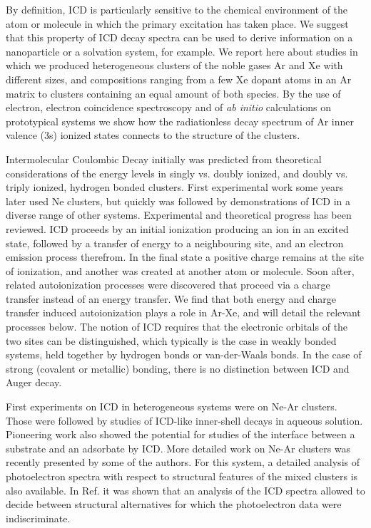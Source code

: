 \documentclass[journal=jpccck,manuscript=article,layout=twocolumn]{achemso}
\begin{document}
By definition, ICD is particularly sensitive to the chemical environment of the atom or molecule in which the primary excitation has taken place. We suggest that this property of ICD decay spectra can be used to derive information on a nanoparticle or a solvation system, for example. We report here about studies in which we produced heterogeneous clusters of the noble gases Ar and Xe with different sizes, and compositions ranging from a few Xe dopant atoms in an Ar matrix to clusters containing an equal amount of both species. By the use of electron, electron coincidence spectroscopy and of {\it ab initio} calculations on prototypical systems we show how the radiationless decay spectrum of Ar inner valence (3s) ionized states connects to the structure of the clusters.

Intermolecular Coulombic Decay initially was predicted from theoretical considerations of the energy levels in singly vs. doubly ionized, and doubly vs. triply ionized, hydrogen bonded clusters.\cite{cederbaum} First experimental work some years later used Ne clusters,\cite{marburger,jahnkenedimer} but quickly was followed by demonstrations of ICD in a diverse range of other systems. Experimental and theoretical progress has been reviewed.\cite{hergenhahn_review, averbukh_review, jahnke_review} ICD proceeds by an initial ionization producing an ion in an excited state, followed by a transfer of energy to a neighbouring site, and an electron emission process therefrom. In the final state a positive charge remains at the site of ionization, and another was created at another atom or molecule. Soon after, related autoionization processes were discovered that proceed via a charge transfer instead of an energy transfer. 
We find that both energy and charge transfer induced autoionization plays a role in Ar-Xe, and will detail the relevant processes below. The notion of ICD requires that the electronic orbitals of the two sites can be distinguished, which typically is the case in weakly bonded systems, held together by hydrogen bonds or van-der-Waals bonds. In the case of strong (covalent or metallic) bonding, there is no distinction between ICD and Auger decay.\cite{hergenhahn_review}

First experiments on ICD in heterogeneous systems were on Ne-Ar clusters.\cite{barthnear} Those were followed by studies of ICD-like inner-shell decays in aqueous solution.\cite{aziz,pokapanich,pokapanich2011} Pioneering work also showed the potential for studies of the interface between a substrate and an adsorbate by ICD.\cite{grieves} More detailed work on Ne-Ar clusters was recently presented by some of the authors.\cite{fasshauer2014} For this system, a detailed analysis of photoelectron spectra with respect to structural features of the mixed clusters is also available.\cite{lundwall} In Ref.  it was shown that an analysis of the ICD spectra allowed to decide between structural alternatives for which the photoelectron data were indiscriminate.
\end{document}
